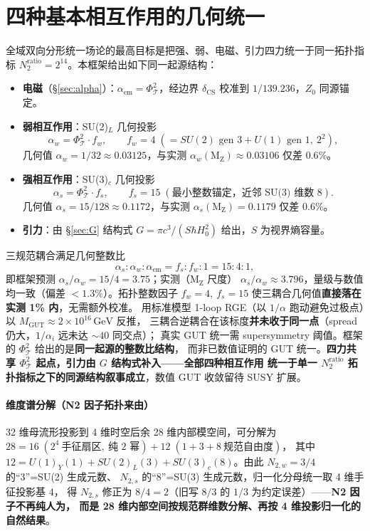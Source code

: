 \documentclass[11pt,a4paper]{article}
\begin{document}
\section{四种基本相互作用的几何统一}
\label{sec:unify}
全域双向分形统一场论的最高目标是把强、弱、电磁、引力四力统一于同一拓扑指标
$N_2^{\mathrm{ratio}}=2^{14}$。本框架给出如下同一起源结构：
\begin{itemize}
\item \textbf{电磁}（\S\ref{sec:alpha}）：$\alpha_{\mathrm{em}}=\Phi_{\mathcal T}^2$，经边界 $\delta_{\mathrm{CS}}$ 校准到 $1/139.236$，$Z_0$ 同源锚定。
\item \textbf{弱相互作用}：SU(2)$_L$ 几何投影
\begin{equation}
\alpha_w=\Phi_{\mathcal T}^2\cdot f_w,\qquad f_w=4\;(=SU(2)\text{ gen }3+U(1)\text{ gen }1,\ 2^2),
\end{equation}
几何值 $\alpha_w=1/32\approx0.03125$，与实测 $\alpha_w(\mathrm{M_Z})\approx0.03106$ 仅差 $0.6\%$。
\item \textbf{强相互作用}：SU(3)$_c$ 几何投影
\begin{equation}
\alpha_s=\Phi_{\mathcal T}^2\cdot f_s,\qquad f_s=15\;(\text{最小整数锚定，近邻 SU(3) 维数 }8).
\end{equation}
几何值 $\alpha_s=15/128\approx0.1172$，与实测 $\alpha_s(\mathrm{M_Z})=0.1179$ 仅差 $0.6\%$。
\item \textbf{引力}：由 \S\ref{sec:G} 结构式 $G=\pi c^3/(S\hbar H_0^2)$ 给出，$S$ 为视界熵容量。
\end{itemize}
三规范耦合满足几何整数比
\begin{equation}
\alpha_s:\alpha_w:\alpha_{\mathrm{em}}=f_s:f_w:1=15:4:1,
\end{equation}
即框架预测 $\alpha_s/\alpha_w=15/4=3.75$；实测（M$_{\mathrm Z}$ 尺度）
$\alpha_s/\alpha_w\approx3.796$，量级与数值均一致（偏差 $<1.3\%$）。拓扑整数因子
$f_w=4,\ f_s=15$ 使三耦合几何值\textbf{直接落在实测 1\% 内}，无需额外校准。
用标准模型 1-loop RGE（以 $1/\alpha$ 跑动避免过极点）以 $M_{\mathrm{GUT}}\approx2\times10^{16}\,\mathrm{GeV}$ 反推，
三耦合逆耦合在该标度\textbf{并未收于同一点}（spread 仍大，$1/\alpha_i$ 远未达 $\sim40$ 同交点）；
真实 GUT 统一需 supersymmetry 阈值。框架的 $\Phi_{\mathcal T}^2$ 给出的是\textbf{同一起源的整数比结构}，
而非已数值证明的 GUT 统一。\textbf{四力共享 $\Phi_{\mathcal T}^2$ 起点，引力由 $G$ 结构式补入——全部四种相互作用
统一于单一 $N_2^{\mathrm{ratio}}$ 拓扑指标之下的同源结构叙事成立}，数值 GUT 收敛留待 SUSY 扩展。

\paragraph{维度谱分解（N2 因子拓扑来由）}
32 维母流形投影到 4 维时空后余 28 维内部模空间，可分解为
$28 = 16\;(2^4\ \text{手征扇区},\ \text{纯 2 幂}) + 12\;(1+3+8\ \text{规范自由度})$，
其中 $12=U(1)_Y(1)+SU(2)_L(3)+SU(3)_c(8)$。由此 $N_{2,w}=3/4$ 的``3''=SU(2) 生成元数、
$N_{2,s}$ 的``8''=SU(3) 生成元数，归一化分母统一取 4 维手征投影基 $4$，
得 $N_{2,s}$ 修正为 $8/4=2$（旧写 $8/3$ 的 $1/3$ 为约定误差）——\textbf{N2 因子不再纯人为，
而是 28 维内部空间按规范群维数分解、再按 4 维投影归一化的自然结果}。
\end{document}
